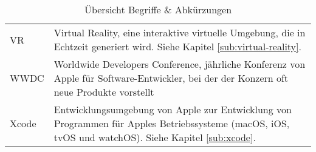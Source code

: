 \begin{table}
\begin{tabular}{@{} p{} p{} @{}}
		VR		& Virtual Reality, eine interaktive virtuelle Umgebung, die in Echtzeit generiert wird. Siehe Kapitel \ref{sub:virtual-reality}. \\
		WWDC	& Worldwide Developers Conference, jährliche Konferenz von Apple für Software-Entwickler, bei der der Konzern oft neue Produkte vorstellt \\
		Xcode	& Entwicklungsumgebung von Apple zur Entwicklung von Programmen für Apples Betriebssysteme (macOS, iOS, tvOS und watchOS). Siehe Kapitel \ref{sub:xcode}. \\
		\hline
	\end{tabular}
	\caption{Übersicht Begriffe \& Abkürzungen}
\end{table}

